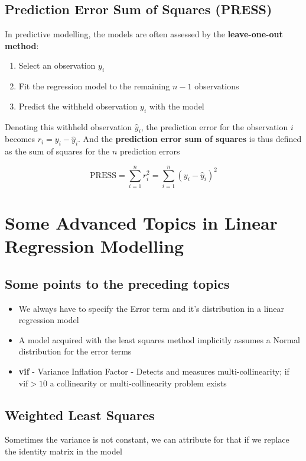 \documentclass[11pt]{article}
\begin{document}
\subsection{Prediction Error Sum of Squares (PRESS)}

In predictive modelling, the models are often assessed by the \textbf{leave-one-out method}:
\begin{enumerate}
	\item Select an observation $y_i$
	\item Fit the regression model to the remaining $n-1$ observations
	\item Predict the withheld observation $y_i$ with the model
\end{enumerate}
\noindent
Denoting this withheld observation $\widehat{y}_i$, the prediction error for the observation $i$ becomes $r_i = y_i -\widehat{y}_i$. And the \textbf{prediction error sum of squares} is thus defined as the sum of squares for the $n$ prediction errors

\begin{equation*}
	\text{PRESS} = \sum_{i=1}^{n} r_i^2 = \sum_{i=1}^{n} (y_i -\widehat{y}_i)^2
\end{equation*}

\section{Some Advanced Topics in Linear Regression Modelling}
\subsection{Some points to the preceding topics}
\begin{itemize}
	\item We always have to specify the Error term and it's distribution in a linear regression model
	\item A model acquired with the least squares method implicitly assumes a Normal distribution for the error terms
	\item \textbf{vif} - Variance Inflation Factor - Detects and measures multi-collinearity; if $\text{vif} > 10$ a collinearity or multi-collinearity problem exists
\end{itemize}

\subsection{Weighted Least Squares}
Sometimes the variance is not constant, we can attribute for that if we replace the identity matrix in the model
\end{document}
